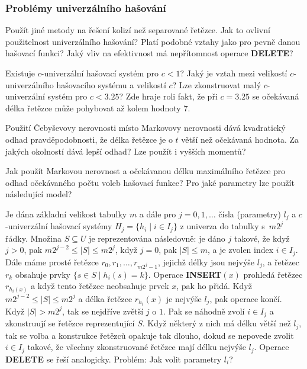 \documentclass[a4paper,12pt]{article}
\begin{document}
\subsubsection{Problémy univerzálního hašování}

Použít jiné metody na řešení kolizí než 
separované řetězce. Jak to ovlivní použitelnost 
univerzálního hašování? Platí podobné vztahy jako pro 
pevně danou hašovací funkci? Jaký vliv na efektivnost 
má nepřítomnost operace {\bf DELETE}?

Existuje $c$-univerzální hašovací systém pro 
$c<1$? Jaký je vztah mezi velikostí $c$-univerzální\-ho 
hašovacího systému a velikostí $c$? Lze zkonstruovat 
malý $c$-univerzální systém pro $c<3.25$? Zde hraje roli 
fakt, že při $c=3.25$ se očekávaná délka řetězce 
může pohybovat až kolem hodnoty $7$.

Použití Čebyševovy nerovnosti místo 
Markovovy nerovnosti dává kvadratický odhad 
prav\-dě\-podobnosti, že délka řetězce je o $t$ větší než 
očekávaná hodnota. Za jakých okolností dává lepší 
odhad? Lze použít i vyšších momentů?

Jak použít Markovou nerovnost a očekávanou 
délku maximál\-ní\-ho řetězce pro odhad očeká\-va\-ného 
počtu voleb hašovací funk\-ce? 
Pro jaké parametry lze použít následující model?

Je dána základní velikost tabulky $m$ a dále pro $
j=0,1,\dots$ 
čísla (parametry) $l_j$ a $c$-univer\-zál\-ní hašovací systémy 
$H_j=\{h_i\mid i\in I_j\}$ z univerza do tabulky s~$m2^j$ řádky.\newline 
Množina $S\subseteq U$ je reprezentována následovně:  je dáno $
j$ 
tako\-vé, že když $j>0$, pak $m2^{j-2}\le |S|\le m2^j$, když $
j=0$, pak 
$|S|\le m$, a je zvolen index $i\in I_j$.  Dále máme prosté řetězce 
$r_0,r_1,\dots,r_{m2^j-1}$, jejichž délky jsou nejvýše $
l_j$, a řetězec $r_k$ 
obsahuje prvky $\{s\in S\mid h_i(s)=k\}$.\newline 
Operace {\bf INSERT$(x)$} prohledá řetězec $r_{h_i(x)}$ a když tento 
ře\-tě\-zec neobsahuje prvek $x$, pak ho přidá.  Když 
$m2^{j-2}\le |S|\le m2^j$ a délka řetězce $r_{h_i}(x)$ je nejvýše $
l_j$, pak 
operace končí.  Když $|S|>m2^j$, tak se nejdříve zvětší $
j$ o $1$.  
Pak se náhodně zvolí $i\in I_j$ a zkonstruují se řetězce 
reprezentující $S$.  Když některý z nich má délku větší než $
l_j$, 
tak se volba a konstrukce řetězců opakuje tak dlouho, 
dokud se nepovede zvolit $i\in I_j$ takové, že všechny 
zkonstruované řetězce mají délku nejvýše $l_j$.  Operace {\bf DELETE }
se řeší analogicky.\newline 
Problém:  Jak volit parametry $l_i$?  
\end{document}
